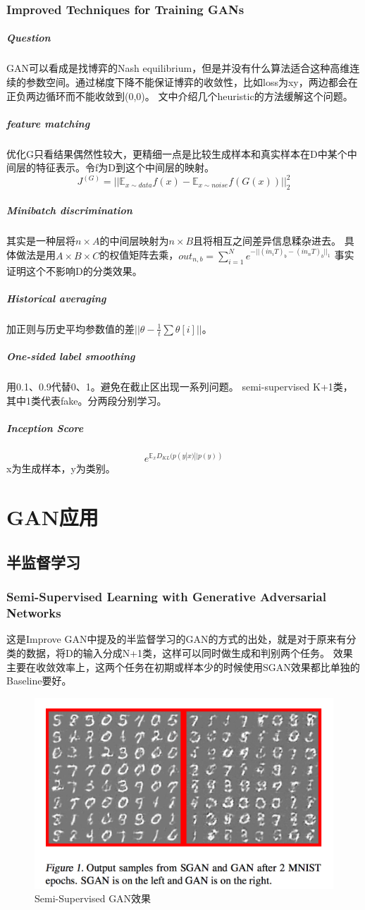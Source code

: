 \documentclass[a4paper]{article}
\begin{document}
\subsubsection{Improved Techniques for Training GANs\cite{DBLP:journals/corr/SalimansGZCRC16}}
\subparagraph{Question}
GAN可以看成是找博弈的Nash equilibrium，但是并没有什么算法适合这种高维连续的参数空间。通过梯度下降不能保证博弈的收敛性，比如loss为xy，两边都会在正负两边循环而不能收敛到(0,0)。
文中介绍几个heuristic的方法缓解这个问题。
 \subparagraph{feature matching}
优化G只看结果偶然性较大，更精细一点是比较生成样本和真实样本在D中某个中间层的特征表示。令f为D到这个中间层的映射。
$$J^{(G)}=||\mathbb{E}_{x\sim data}f(x)-\mathbb{E}_{x\sim noise}f(G(x))||^2_2$$
 \subparagraph{Minibatch discrimination}
其实是一种层将$n\times A$的中间层映射为$n\times B$且将相互之间差异信息糅杂进去。
具体做法是用$A\times B \times C$的权值矩阵去乘，$out_{n,b}=\sum\limits_{i=1}^N e^{-||(in_iT)_b - (in_nT)_b||_1}$
事实证明这个不影响D的分类效果。
 \subparagraph{Historical averaging}
加正则与历史平均参数值的差$||\theta - \frac{1}{t}\sum \theta[i]||$。
 \subparagraph{One-sided label smoothing}
用0.1、0.9代替0、1。避免在截止区出现一系列问题。
 semi-supervised
K+1类，其中1类代表fake。分两段分别学习。
 \subparagraph{Inception Score}
$$e^{\mathbb{E}_xD_{KL}(p(y|x)||p(y))}$$
x为生成样本，y为类别。


\section{GAN应用}
\subsection{半监督学习}
\subsubsection{Semi-Supervised Learning with Generative Adversarial Networks\cite{DBLP:journals/corr/Odena16a}}
这是Improve GAN中提及的半监督学习的GAN的方式的出处，就是对于原来有分类的数据，将D的输入分成N+1类，这样可以同时做生成和判别两个任务。
效果主要在收敛效率上，这两个任务在初期或样本少的时候使用SGAN效果都比单独的Baseline要好。
\begin{figure}
\centering
\includegraphics[width=\textwidth]{./img/20.png}
\caption{Semi-Supervised GAN效果}
\label{fig:20}
\end{figure}
\end{document}
